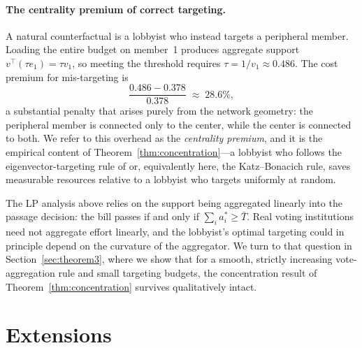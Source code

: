 \documentclass[11pt,letterpaper]{article}
\theoremstyle{plain}
\theoremstyle{definition}
\theoremstyle{remark}
\begin{document}
\paragraph{The centrality premium of correct targeting.} A natural counterfactual is a lobbyist who instead targets a peripheral member. Loading the entire budget on member~1 produces aggregate support $v^\top (\tau e_1) = \tau v_1$, so meeting the threshold requires $\tau = 1/v_1 \approx 0.486$. The cost premium for mis-targeting is
\[
\frac{0.486 - 0.378}{0.378} \;\approx\; 28.6\%,
\]
a substantial penalty that arises purely from the network geometry: the peripheral member is connected only to the center, while the center is connected to both. We refer to this overhead as the \emph{centrality premium}, and it is the empirical content of Theorem~\ref{thm:concentration}---a lobbyist who follows the eigenvector-targeting rule of \citet{ggg2020} or, equivalently here, the Katz--Bonacich rule, saves measurable resources relative to a lobbyist who targets uniformly at random.

\medskip

The LP analysis above relies on the support being aggregated linearly into the passage decision: the bill passes if and only if $\sum_i a_i^* \geq \bar T$. Real voting institutions need not aggregate effort linearly, and the lobbyist's optimal targeting could in principle depend on the curvature of the aggregator. We turn to that question in Section~\ref{sec:theorem3}, where we show that for a smooth, strictly increasing vote-aggregation rule and small targeting budgets, the concentration result of Theorem~\ref{thm:concentration} survives qualitatively intact.


\section{Extensions}
\label{sec:extensions}
\end{document}

